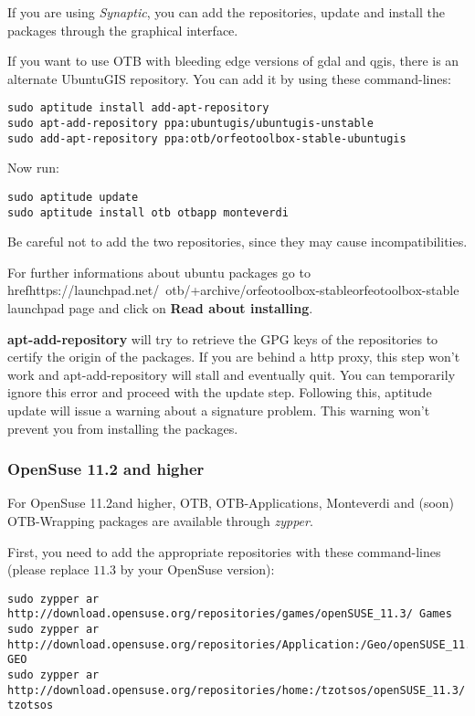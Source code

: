 If you are using \emph{Synaptic}, you can add the repositories, update and install the packages through the
graphical interface.

If you want to use OTB with bleeding edge versions of gdal and qgis, there is an alternate UbuntuGIS repository.
You can add it by using these command-lines:
\begin{verbatim}
sudo aptitude install add-apt-repository 
sudo apt-add-repository ppa:ubuntugis/ubuntugis-unstable
sudo add-apt-repository ppa:otb/orfeotoolbox-stable-ubuntugis
\end{verbatim}
Now run:
\begin{verbatim}
sudo aptitude update
sudo aptitude install otb otbapp monteverdi
\end{verbatim}

Be careful not to add the two repositories, since they may cause incompatibilities.

For further informations about ubuntu packages go to href{https://launchpad.net/~otb/+archive/orfeotoolbox-stable}{orfeotoolbox-stable launchpad page} and click on \textbf{Read about installing}.

\textbf{apt-add-repository} will try to retrieve the GPG keys of the repositories to certify the origin of the packages. If you are behind a http proxy, this step won't work and apt-add-repository will stall and eventually quit. You can temporarily ignore this error and proceed with the update step. Following this, aptitude update will issue a warning about a signature problem. This warning won't prevent you from installing the packages.

\subsubsection{OpenSuse 11.2 and higher}
\label{ssec:opensuse_binaries}

For OpenSuse 11.2and higher, OTB, OTB-Applications, Monteverdi and (soon)
OTB-Wrapping packages are available through \emph{zypper}.

First, you need to add the appropriate repositories with these command-lines (please replace $11.3$ by your OpenSuse version):
\begin{verbatim}
sudo zypper ar 
http://download.opensuse.org/repositories/games/openSUSE_11.3/ Games
sudo zypper ar 
http://download.opensuse.org/repositories/Application:/Geo/openSUSE_11.3/ GEO
sudo zypper ar 
http://download.opensuse.org/repositories/home:/tzotsos/openSUSE_11.3/ tzotsos
\end{verbatim}

